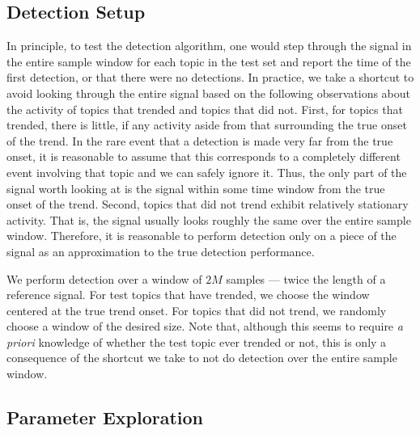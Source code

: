 \subsection{Detection Setup}
In principle, to test the detection algorithm, one would step through the signal
in the entire sample window for each topic in the test set and report the time
of the first detection, or that there were no detections. In practice, we take a
shortcut to avoid looking through the entire signal based on the following
observations about the activity of topics that trended and topics that did
not. First, for topics that trended, there is little, if any activity aside from
that surrounding the true onset of the trend. In the rare event that a detection
is made very far from the true onset, it is reasonable to assume that this
corresponds to a completely different event involving that topic and we can
safely ignore it. Thus, the only part of the signal worth looking at is the
signal within some time window from the true onset of the trend. Second, topics
that did not trend exhibit relatively stationary activity. That is, the signal
usually looks roughly the same over the entire sample window. Therefore, it is
reasonable to perform detection only on a piece of the signal as an
approximation to the true detection performance.

We perform detection over a window of $2M$ samples --- twice the length of a
reference signal. For test topics that have trended, we choose the window
centered at the true trend onset. For topics that did not trend, we randomly
choose a window of the desired size. Note that, although this seems to require
{\em a priori} knowledge of whether the test topic ever trended or not, this is
only a consequence of the shortcut we take to not do detection over the entire
sample window.

\subsection{Parameter Exploration}
